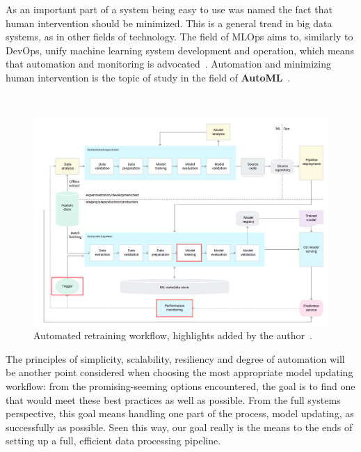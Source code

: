 As an important part of a system being easy to use was named the fact that human intervention should be minimized. This is a general trend in big data systems, as in other fields of technology. The field of MLOps aims to, similarly to DevOps, unify machine learning system development and operation, which means that automation and monitoring is advocated~\cite{googlemlops}. Automation and minimizing human intervention is the topic of study in the field of \textbf{AutoML}~\cite{celikAdaptationStrategiesAutomated2021}.

\begin{figure}[ht]
\ \newline
\begin{center}
\includegraphics[width=1.0\columnwidth]{triggergooglemarked.png}
\caption{Automated retraining workflow, highlights added by the author~\cite{googlemlops}.}
\label{triggerpipeline}
\end{center}
\end{figure}

The principles of simplicity, scalability, resiliency and degree of automation will be another point considered when choosing the most appropriate model updating workflow: from the promising-seeming options encountered, the goal is to find one that would meet these best practices as well as possible. From the full systems perspective, this goal means handling one part of the process, model updating, as successfully as possible. Seen this way, our goal really is the means to the ends of setting up a full, efficient data processing pipeline.

